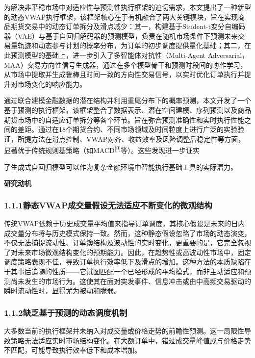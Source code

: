 为解决非平稳市场中对适应性与预测性执行框架的迫切需求，本文提出了一种新型的动态VWAP执行框架，该框架核心在于有机融合了两大关键模块，旨在实现商品期货交易中的动态订单拆分及滑点减少：其一，构建基于Student-t变分自编码器（VAE）与基于自回归解码器的预测模型，负责在随机市场条件下预测未来交易量轨迹和动态参与计划的概率分布，为订单的初步调度提供量化基础；其二，在此预测模型的基础上，进一步引入了多智能体对抗性（Multi-Agent
Adversarial，MAA）交易方向性信号生成器，通过在多个模型骨干和预测时段间的协作学习，从市场中提取并生成鲁棒且时间一致的方向性交易信号，以实时优化订单执行并提升对市场变化的响应能力。

通过联合建模金融数据的潜在结构并利用重尾分布下的概率预测，本文开发了一个基于预测的执行框架，该框架整合了数据表示、潜在空间建模、序列预测以及商品期货市场中的自适应订单拆分等各个环节。旨在弥合预测准确性和实时执行性能之间的差距。通过在18个期货合约、不同市场领域及时间粒度上进行广泛的实验验证，所提方法在滑点控制、VWAP对齐、收益效率及风险调整后稳定性等方面，显著优于传统规则基策略（如MACD\textsuperscript{{[}9{]}}等）。这些发现进一步证实

了生成式自回归模型可以作为复杂金融环境中智能执行基础工具的实际潜力。

\textbf{研究动机}

\subsubsection{\texorpdfstring{\textbf{1.1.1静态}VWAP\textbf{成交量假设无法适应不断变化的微观结构}}{1.1.1静态VWAP成交量假设无法适应不断变化的微观结构}}

传统VWAP依赖于历史成交量平均值来指导订单调度，其核心假设是未来的日内成交量分布将与历史模式保持一致。然而，这种静态假设忽略了市场的动态演变，不仅无法捕捉流动性、订单簿结构及波动性的实时变化，更重要的是，它完全忽视了对未来市场微观结构变化的预期能力。因此，在趋势性或高波动性市场中，固定调度策略表现不佳，导致订单执行效率低下及滑点的增加。这种方法的本质缺陷在于其事后追随的性质------它试图匹配一个已经形成的平均模式，而非主动适应和预测尚未发生的市场行为。这使其在面对突发事件、信息冲击或由中高频交易驱动的瞬时流动性时，显得尤为被动和脆弱。

\subsubsection{\texorpdfstring{\textbf{1.1.2缺乏基于预测的动态调度机制}}{1.1.2缺乏基于预测的动态调度机制}}

大多数当前的执行框架并未纳入对成交量或价格走势的前瞻性预测。这一局限性导致策略无法适应实时市场结构变化。在大额订单中，错过成交量峰值或与价格走势不匹配，可能导致执行效率低下和成本增加。

